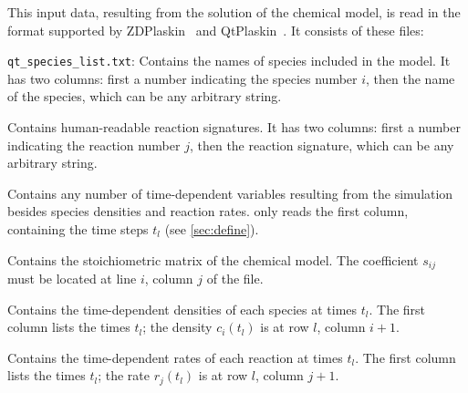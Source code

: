 This input data, resulting from the solution of the chemical model, is read
in the format supported by ZDPlaskin~\cite{Sergey2008,Flitti2009} and
QtPlaskin~\cite{Qtplaskin}.  It consists of these files:
\begin{description}
  \item{\verb|qt_species_list.txt|:} Contains the names of species included in the model.  It has two columns: first a number indicating the species number $i$, then the name of the species, which can be any arbitrary string.
  \item{} Contains human-readable reaction signatures.  It has two columns: first a number indicating the reaction number $j$, then the reaction signature, which can be any arbitrary string.
  \item{} Contains any number of time-dependent variables resulting from the simulation besides species densities and reaction rates.  \pump{} only reads the first column, containing the time steps $t_l$ (see \ref{sec:define}).
  \item{} Contains the stoichiometric matrix of the chemical model.  The coefficient $s_{ij}$ must be located at  line $i$, column $j$ of the file.
  \item{} Contains the time-dependent densities of each species at times $t_l$.  The first column lists the times $t_l$; the density $c_i(t_l)$ is at row $l$, column $i+1$.
  \item{} Contains the time-dependent rates of each reaction at times $t_l$.  The first column lists the times $t_l$; the rate $r_j(t_l)$ is at row $l$, column $j+1$.
\end{description}

